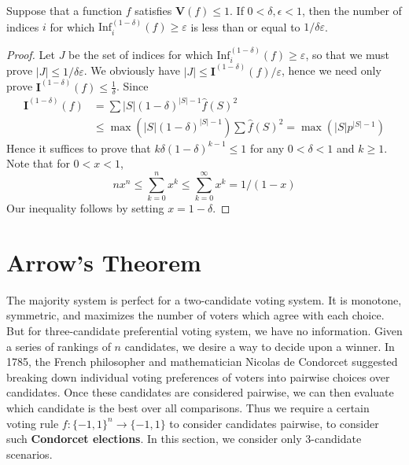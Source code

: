 \begin{theorem}
    Suppose that a function $f$ satisfies $\mathbf{V}(f) \leq 1$. If $0 < \delta, \epsilon < 1$, then the number of indices $i$ for which $\text{Inf}^{(1 - \delta)}_i(f) \geq \varepsilon$ is less than or equal to $1/\delta\varepsilon$.
\end{theorem}
\begin{proof}
    Let $J$ be the set of indices for which $\text{Inf}^{(1 - \delta)}_i(f) \geq \varepsilon$, so that we must prove $|J| \leq 1/\delta\varepsilon$. We obviously have $|J| \leq \mathbf{I}^{(1 - \delta)}(f)/\varepsilon$, hence we need only prove $\mathbf{I}^{(1 - \delta)}(f) \leq \frac{1}{\delta}$. Since
    \begin{align*}
        \mathbf{I}^{(1 - \delta)}(f) &= \sum |S| (1 - \delta)^{|S|-1} \widehat{f}(S)^2\\
        &\leq \max(|S| (1 - \delta)^{|S|-1}) \sum \widehat{f}(S)^2 = \max(|S| p^{|S|-1})
    \end{align*}
    Hence it suffices to prove that $k\delta (1 - \delta)^{k - 1} \leq 1$ for any $0 < \delta < 1$ and $k \geq 1$. Note that for $0 < x < 1$,
    \[ nx^n \leq \sum_{k = 0}^n x^k \leq \sum_{k = 0}^\infty x^k = 1/(1 - x) \]
    Our inequality follows by setting $x = 1 - \delta$.
\end{proof}

\section{Arrow's Theorem}

The majority system is perfect for a two-candidate voting system. It is monotone, symmetric, and maximizes the number of voters which agree with each choice. But for three-candidate preferential voting system, we have no information. Given a series of rankings of $n$ candidates, we desire a way to decide upon a winner. In 1785, the French philosopher and mathematician Nicolas de Condorcet suggested breaking down individual voting preferences of voters into pairwise choices over candidates. Once these candidates are considered pairwise, we can then evaluate which candidate is the best over all comparisons. Thus we require a certain voting rule $f: \{ -1, 1 \}^n \to \{ -1, 1 \}$ to consider candidates pairwise, to consider such {\bf Condorcet elections}. In this section, we consider only 3-candidate scenarios.

